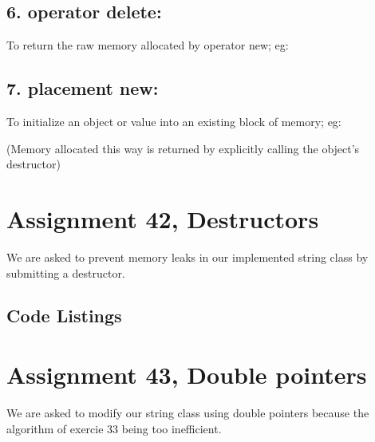 \documentclass[11pt]{article}
\begin{document}
\subsection*{6. operator delete:}
To return the raw memory allocated by operator new; eg:

\subsection*{7. placement new:}
To initialize an object or value into an existing block of memory; eg:

(Memory allocated this way is returned by explicitly calling the object's destructor)

\section*{Assignment 42, Destructors}
We are asked to prevent memory leaks in our implemented string class by submitting a destructor.
\subsection*{Code Listings}



\section*{Assignment 43, Double pointers}
We are asked to modify our string class using double pointers because the algorithm of exercie 33 being too inefficient.
\end{document}

